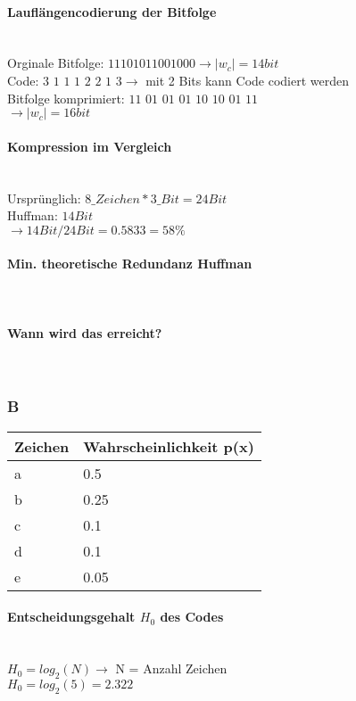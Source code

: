 \paragraph{Lauflängencodierung der Bitfolge}\mbox{}\\
Orginale Bitfolge: $11101011001000 \rightarrow |w_c| = 14 bit$\\
Code: $3$ $1$ $1$ $1$ $2$ $2$ $1$ $3 \rightarrow$ mit 2 Bits kann Code codiert werden\\
Bitfolge komprimiert: $11$ $01$ $01$ $01$ $10$ $10$ $01$ $11$\\
$\rightarrow |w_c| = 16 bit$

\paragraph{Kompression im Vergleich}\mbox{}\\
Ursprünglich: $8\_Zeichen * 3\_Bit = 24 Bit$\\
Huffman: $14 Bit$\\
$\rightarrow 14Bit/24Bit=0.5833=58\%$

\paragraph{Min. theoretische Redundanz Huffman}\mbox{}\\

\paragraph{Wann wird das erreicht?}\mbox{}\\

\subsubsection{B}
\begin{center}
    \centering
    \begin{tabular}{l | l}
        \bfseries{Zeichen} & \bfseries{Wahrscheinlichkeit p(x)}\\ \hline
        a & 0.5\\ 
        b & 0.25\\
        c & 0.1\\
        d & 0.1\\
        e & 0.05
    \end{tabular}
\end{center}

\paragraph{Entscheidungsgehalt $H_0$ des Codes}\mbox{}\\
$H_0=log_2(N) \rightarrow$ N = Anzahl Zeichen\\
$H_0=log_2(5)=2.322$

